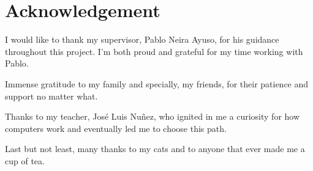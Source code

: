 \chapter*{Acknowledgement}
I would like to thank my supervisor, Pablo Neira Ayuso, for his guidance throughout this project. I’m both proud and grateful for my time working with Pablo.

Immense gratitude to my family and specially, my friends, for their patience and support no matter what.

Thanks to my teacher, José Luis Nuñez, who ignited in me a curiosity for how computers work and eventually led me to choose this path.

Last but not least, many thanks to my cats and to anyone that ever made me a cup of tea.
